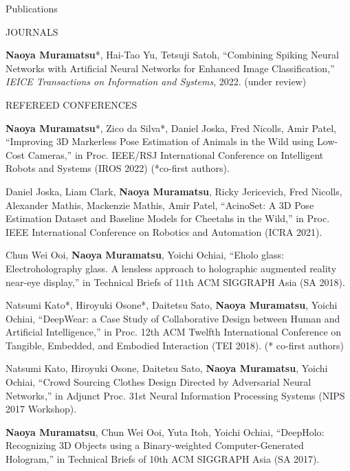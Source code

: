 \documentclass{resume} %
\begin{document}

\begin{rSection}{Publications} \itemsep 4pt

    \begin{rSubsection}{JOURNALS}{}{}{}{}
        \item \textbf{Naoya Muramatsu}*, Hai-Tao Yu, Tetsuji Satoh, ``Combining Spiking Neural Networks with Artificial Neural Networks for Enhanced Image Classification,'' \textit{IEICE Transactions on Information and Systems}, 2022. (under review)
    \end{rSubsection}

    \begin{rSubsection}{REFEREED CONFERENCES}{}{}{}{}
        \item \textbf{Naoya Muramatsu}*, Zico da Silva*, Daniel Joska, Fred Nicolls, Amir Patel, ``Improving 3D Markerless Pose Estimation of Animals in the Wild using Low-Cost Cameras,'' in Proc. IEEE/RSJ International Conference on Intelligent Robots and Systems (IROS 2022) (*co-first authors).
        \item Daniel Joska, Liam Clark, \textbf{Naoya Muramatsu}, Ricky Jericevich, Fred Nicolls, Alexander Mathis, Mackenzie Mathis, Amir Patel, ``AcinoSet: A 3D Pose Estimation Dataset and Baseline Models for Cheetahs in the Wild,'' in Proc. IEEE International Conference on Robotics and Automation (ICRA 2021).
        \item Chun Wei Ooi, \textbf{Naoya Muramatsu}, Yoichi Ochiai, ``Eholo glass: Electroholography glass. A lensless approach to holographic augmented reality near-eye display,'' in Technical Briefs of 11th ACM SIGGRAPH Asia (SA 2018).
        \item Natsumi Kato*, Hiroyuki Osone*, Daitetsu Sato, \textbf{Naoya Muramatsu}, Yoichi Ochiai, ``DeepWear: a Case Study of Collaborative Design between Human and Artificial Intelligence,''  in Proc. 12th ACM Twelfth International Conference on Tangible, Embedded, and Embodied Interaction (TEI 2018). (* co-first authors)
        \item Natsumi Kato, Hiroyuki Osone, Daitetsu Sato, \textbf{Naoya Muramatsu}, Yoichi Ochiai, ``Crowd Sourcing Clothes Design Directed by Adversarial Neural Networks,'' in  Adjunct Proc. 31st Neural Information Processing Systems (NIPS 2017 Workshop).
        \item \textbf{Naoya Muramatsu}, Chun Wei Ooi, Yuta Itoh, Yoichi Ochiai, ``DeepHolo: Recognizing 3D Objects using a Binary-weighted Computer-Generated Hologram,'' in Technical Briefs of 10th ACM SIGGRAPH Asia (SA 2017).

\end{rSubsection}
\end{rSection}
\end{document}
